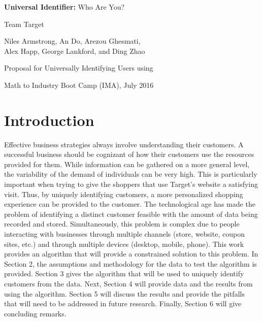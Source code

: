 \documentclass{article}
\theoremstyle{plain}			%
\theoremstyle{definition}		%
\theoremstyle{remark}
\numberwithin{equation}{section}
\numberwithin{figure}{section}
\numberwithin{table}{section}
\begin{document}
	
\begin{titlepage}
	\begin{center}
		\vspace*{1cm}
		
		\huge
		\textbf{Universal Identifier:} Who Are You?
		
		
		\vspace{1cm}
		
		\LARGE{Team Target}
		
		\vspace{0.3 cm}
		\large{Niles Armstrong, An Do, Arezou Ghesmati,\\ Alex Happ, George Lankford,
			and Ding Zhao}
		
		\vspace{1cm}
		
		
		
		\vfill
		
		\begin{flushright}
		\Large
		Proposal for Universally Identifying Users using 
		
		\vspace{0.3cm}
	
		\Large
		Math to Industry Boot Camp (IMA), July 2016
		\end{flushright}
				
	\end{center}
\end{titlepage}
	
\section{Introduction}
Effective business strategies always involve understanding their customers. A successful business should be cognizant of how their customers use the resources provided for them. While information can be gathered on a more general level, the variability of the demand of individuals can be very high. This is particularly important when trying to give the shoppers that use Target's website a satisfying visit. Thus, by uniquely identifying customers, a more personalized shopping experience can be provided to the customer. The technological age has made the problem of identifying a distinct customer feasible with the amount of data being recorded and stored. Simultaneously, this problem is complex due to people interacting with businesses through multiple channels (store, website, coupon sites, etc.) and through multiple devices (desktop, mobile, phone). This work provides an algorithm that will provide a constrained solution to this problem. In Section 2, the assumptions and methodology for the data to test the algorithm is provided. Section 3 gives the algorithm that will be used to uniquely identify customers from the data. Next, Section 4 will provide data and the results from using the algorithm. Section 5 will discuss the results and provide the pitfalls that will need to be addressed in future research. Finally, Section 6 will give concluding remarks.
\end{document}
